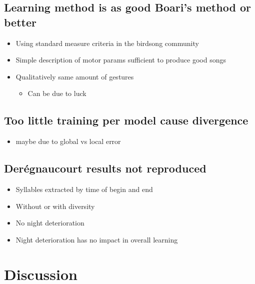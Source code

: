 \section{Learning method is as good Boari's method or
better}\label{learning-method-is-as-good-boaris-method-or-better}

\begin{itemize}
\tightlist
\item
  Using standard measure criteria in the birdsong community
\item
  Simple description of motor params sufficient to produce good songs
\item
  Qualitatively same amount of gestures

  \begin{itemize}
  \tightlist
  \item
    Can be due to luck
  \end{itemize}
\end{itemize}

\section{Too little training per model cause
divergence}\label{too-little-training-per-model-cause-divergence}

\begin{itemize}
\tightlist
\item
  maybe due to global vs local error
\end{itemize}

\section{Derégnaucourt results not
reproduced}\label{deruxe9gnaucourt-results-not-reproduced}

\begin{itemize}
\tightlist
\item
  Syllables extracted by time of begin and end
\item
  Without or with diversity
\item
  No night deterioration
\item
  Night deterioration has no impact in overall learning
\end{itemize}

\chapter{Discussion}\label{discussion}

